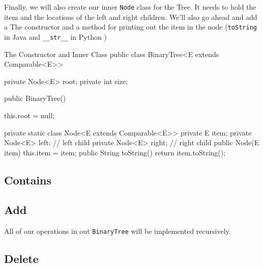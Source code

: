 Finally, we will also create our inner \texttt{Node} class for the Tree.
It needs to hold the item and the locations of the left and right children.
We'll also go ahead and add a The constructor and a method for printing out the item in the node (\texttt{toString} in Java and \texttt{\_\_str\_\_} in Python )

\begin{javacode}{The Constructor and Inner Class}
public class BinaryTree<E extends Comparable<E>> {
	private Node<E> root;
	private int size;
	
	public BinaryTree() {
		this.root = null;
		
	}
	
	private static class Node<E extends Comparable<E>> {
		private E item;
		private Node<E> left;  // left child
		private Node<E> right; // right child
		public Node(E item) {
			this.item = item;
		}
		public String toString() {
			return item.toString();
		}
	}
	
	
}
\end{javacode}


\subsection{Contains}



\subsection{Add}


All of our operations in out \texttt{BinaryTree} will be implemented recursively.



\subsection{Delete}
